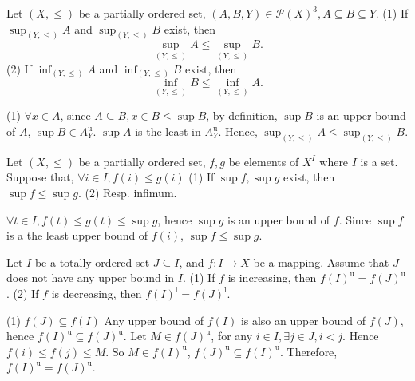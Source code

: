 \begin{propositionenv}\label{proposition4.5.2}
    \quad
    \newline
    Let $(X, \le )$ be a partially ordered set, $(A, B, Y)\in \mathscr{P} (X)^3, A\subseteq B\subseteq Y$.
    \newline
    (1) If $\sup_{(Y, \le)}A$ and $\sup_{(Y, \le)}B$ exist,  then $$\sup_{(Y, \le)}A \le \sup_{(Y, \le)}B.$$
    \newline
    (2) If $\inf_{(Y, \le)}A$ and $\inf_{(Y, \le)}B$ exist,  then $$\inf_{(Y, \le)}B \le \inf_{(Y, \le)}A.$$
    
\end{propositionenv}
\begin{proofenv}
    \quad
    \newline
    (1) $\forall x\in A$, since $A\subseteq B, x\in B \le \sup B$, by definition,  $\sup B$ is an upper bound of $A$, $\sup B\in A_Y^\mathrm{u}$. $\sup A$ is the least in $A_Y^\mathrm{u}$. Hence, $\sup_{(Y, \le)}A \le \sup_{(Y, \le)}B$.
\end{proofenv}
\begin{propositionenv}\label{proposition4.5.3}
    Let $(X, \le )$ be a partially ordered set, $f, g$ be elements of $X^I$ where $I$ is a set. Suppose that, $\forall i\in  I , f(i)\le g(i)$
 \newline
 (1) If $\sup f, \sup g$ exist, then $\sup f\le\sup g$.
 \newline
 (2) Resp. infimum.
\end{propositionenv}
\begin{proofenv}
    $\forall t\in I, f(t)\le g(t)\le \sup g$, hence $\sup g$ is an upper bound of $f$. Since $\sup f $ is a the least upper bound of $f(i)$, $\sup f\le\sup g$.
\end{proofenv}
\begin{propositionenv}
    Let $I$ be a totally ordered set $J\subseteq I $, and $f:I\rightarrow X $ be a mapping. Assume that $J$ does not have any upper bound in $I$.
    \newline 
    (1) If $f$ is increasing,  then $f(I)^\mathrm{u}=f(J)^\mathrm{u}$.
    \newline
    (2) If $f$ is decreasing,  then $f(I)^\mathrm{l}=f(J)^\mathrm{l}$.
\end{propositionenv}
\begin{proofenv}
    \quad 
    \newline
    (1) $f(J)\subseteq f(I)$ Any upper bound of $f(I)$ is also an upper bound of $f(J)$, hence $f(I)^\mathrm{u}\subseteq f(J)^\mathrm{u}$. Let $M\in f(J)^\mathrm{u}$, for any $i\in I, \exists j\in J, i<j$. Hence $f(i)\le f(j)\le M$. So $M\in f(I)^\mathrm{u}$, $f(J)^\mathrm{u}\subseteq f(I)^\mathrm{u}$. Therefore, $f(I)^\mathrm{u}=f(J)^\mathrm{u}$.
\end{proofenv}

